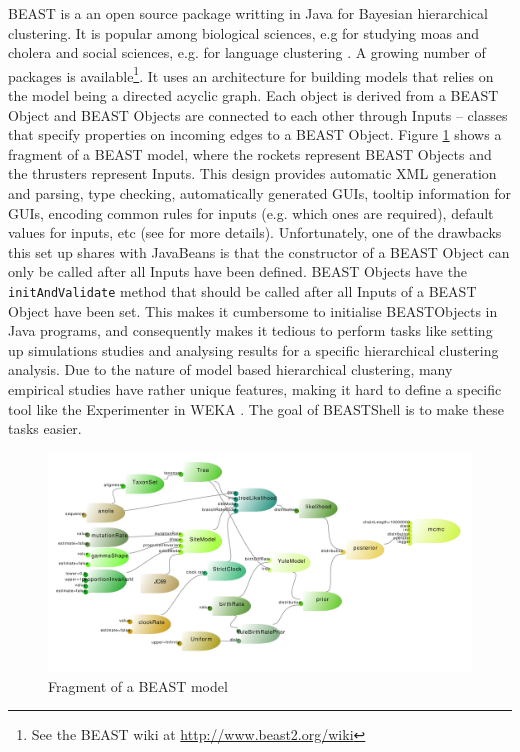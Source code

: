 \documentclass[twoside,11pt]{article}
\begin{document}
BEAST \citep{beast2} is a an open source package writting in Java for Bayesian hierarchical 
clustering. It is popular among biological sciences, e.g for studying moas \citep{bunce2003extreme}
and cholera \citep{mutreja2011evidence} and social sciences, e.g. for language clustering \citep{bouckaert2012mapping,gray2009language}.
A growing number of packages is available\footnote{See the BEAST wiki at
\url{http://www.beast2.org/wiki}}. It uses an architecture for building models that 
relies on the model being a directed acyclic graph. Each object is derived from a BEAST 
Object and BEAST Objects are connected to each other through Inputs -- classes that 
specify properties on incoming edges to a BEAST Object. Figure \ref{fig.model} shows
a fragment of a BEAST model, where the rockets represent BEAST Objects and the thrusters
represent Inputs. This design provides automatic XML generation and parsing, type checking, 
automatically generated GUIs, tooltip information for GUIs, encoding common
rules for inputs (e.g. which ones are required), default values for inputs, etc (see
\cite{beastbook} for more details). Unfortunately, one of the drawbacks this set up
shares with JavaBeans is that the constructor of a BEAST Object can only be called after
all Inputs have been defined. BEAST Objects have the {\tt initAndValidate} method that should be 
called after all Inputs of a BEAST Object have been set. This makes it cumbersome to
initialise BEASTObjects in Java programs, and consequently makes it tedious to perform
tasks like setting up simulations studies and analysing results for a specific hierarchical
clustering analysis. Due to the nature of model based hierarchical clustering, many
empirical studies have rather unique features, making it hard to define a specific tool like 
the Experimenter in WEKA \citep{weka}.
The goal of BEASTShell is to make these tasks easier.

\begin{figure}
\begin{center}
\includegraphics[width=0.8
\textwidth]{model}
\end{center}
\caption{\label{fig.model}Fragment of a BEAST model}
\end{figure}
\end{document}
